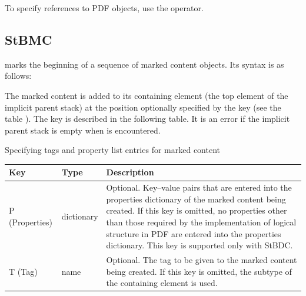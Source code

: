 \documentclass[letterpaper,12pt,english,openany,oneside]{sphinxmanual}
\begin{document}
To specify references to PDF objects, use the  operator.


\subsection{StBMC}
\label{\detokenize{pdfmark_Logical:stbmc}}
 marks the beginning of a sequence of marked content objects. Its syntax is as follows:

\begin{sphinxVerbatim}[commandchars=\\\{\}]
 \PYG{p}{[} 
\PYG{p}{[} 
\PYG{p}{[} 
         
\end{sphinxVerbatim}

The marked content is added to its containing element (the top element of the implicit parent stack) at the position optionally specified by the  key (see the table ). The  key is described in the following table. It is an error if the implicit parent stack is empty when  is encountered.

Specifying tags and property list entries for marked content


\begin{savenotes}\sphinxattablestart
\centering
{}\label{\detokenize{pdfmark_Logical:section-2}}\nobreak
\begin{tabulary}{\linewidth}[t]{|T|T|T|}
\hline
\sphinxstyletheadfamily 
Key
&\sphinxstyletheadfamily 
Type
&\sphinxstyletheadfamily 
Description
\\
\hline
P (Properties)
&
dictionary
&
Optional. Key–value pairs that are entered into the properties dictionary of the marked content being created. If this key is omitted, no properties other than those required by the implementation of logical structure in PDF are entered into the properties dictionary. This key is supported only with StBDC.
\\
\hline
T (Tag)
&
name
&
Optional. The tag to be given to the marked content being created. If this key is omitted, the subtype of the containing element is used.
\\
\hline
\end{tabulary}
\par
\sphinxattableend\end{savenotes}
\end{document}
